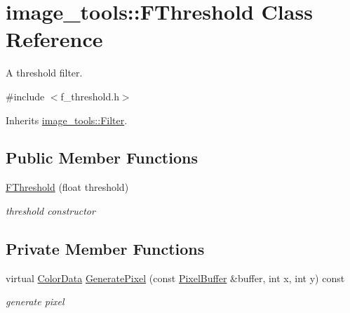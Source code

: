 \hypertarget{classimage__tools_1_1FThreshold}{}\section{image\+\_\+tools\+:\+:F\+Threshold Class Reference}
\label{classimage__tools_1_1FThreshold}


A threshold filter.  




{\ttfamily \#include $<$f\+\_\+threshold.\+h$>$}



Inherits \hyperlink{classimage__tools_1_1Filter}{image\+\_\+tools\+::\+Filter}.

\subsection*{Public Member Functions}
\begin{DoxyCompactItemize}
\item 
\hyperlink{classimage__tools_1_1FThreshold_a999a5dfc3f95d147b4030789ebb77931}{F\+Threshold} (float threshold)\hypertarget{classimage__tools_1_1FThreshold_a999a5dfc3f95d147b4030789ebb77931}{}\label{classimage__tools_1_1FThreshold_a999a5dfc3f95d147b4030789ebb77931}

\begin{DoxyCompactList}\small\item\em threshold constructor \end{DoxyCompactList}\end{DoxyCompactItemize}
\subsection*{Private Member Functions}
\begin{DoxyCompactItemize}
\item 
virtual \hyperlink{classimage__tools_1_1ColorData}{Color\+Data} \hyperlink{classimage__tools_1_1FThreshold_a39d2402969ac038c7ab132f68a754637}{Generate\+Pixel} (const \hyperlink{classimage__tools_1_1PixelBuffer}{Pixel\+Buffer} \&buffer, int x, int y) const \hypertarget{classimage__tools_1_1FThreshold_a39d2402969ac038c7ab132f68a754637}{}\label{classimage__tools_1_1FThreshold_a39d2402969ac038c7ab132f68a754637}

\begin{DoxyCompactList}\small\item\em generate pixel \end{DoxyCompactList}\end{DoxyCompactItemize}
